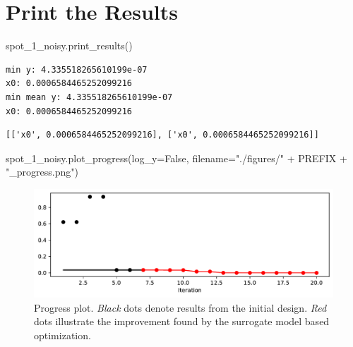 \documentclass[
  letterpaper,
  DIV=11,
  numbers=noendperiod]{scrreprt}
\newenvironment{Shaded}{\begin{snugshade}}{\end{snugshade}}
\newcommand{\NormalTok}[1]{\textcolor[rgb]{0.00,0.23,0.31}{#1}}
\newcommand{\OperatorTok}[1]{\textcolor[rgb]{0.37,0.37,0.37}{#1}}
\newcommand{\StringTok}[1]{\textcolor[rgb]{0.13,0.47,0.30}{#1}}
\newcommand{\VariableTok}[1]{\textcolor[rgb]{0.07,0.07,0.07}{#1}}
\begin{document}
\section{Print the Results}\label{print-the-results-3}

\begin{Shaded}
\begin{Highlighting}[]
\NormalTok{spot\_1\_noisy.print\_results()}
\end{Highlighting}
\end{Shaded}

\begin{verbatim}
min y: 4.335518265610199e-07
x0: 0.0006584465252099216
min mean y: 4.335518265610199e-07
x0: 0.0006584465252099216
\end{verbatim}

\begin{verbatim}
[['x0', 0.0006584465252099216], ['x0', 0.0006584465252099216]]
\end{verbatim}

\begin{Shaded}
\begin{Highlighting}[]
\NormalTok{spot\_1\_noisy.plot\_progress(log\_y}\OperatorTok{=}\VariableTok{False}\NormalTok{,}
\NormalTok{    filename}\OperatorTok{=}\StringTok{"./figures/"} \OperatorTok{+}\NormalTok{ PREFIX }\OperatorTok{+} \StringTok{"\_progress.png"}\NormalTok{)}
\end{Highlighting}
\end{Shaded}

\begin{figure}[H]

{\centering \includegraphics{013_num_spot_noisy_files/figure-pdf/cell-12-output-1.pdf}

}

\caption{Progress plot. \emph{Black} dots denote results from the
initial design. \emph{Red} dots illustrate the improvement found by the
surrogate model based optimization.}

\end{figure}%
\end{document}
